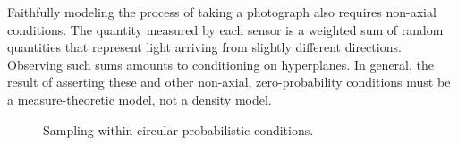 Faithfully modeling the process of taking a photograph also requires non-axial conditions.
The quantity measured by each sensor is a weighted sum of random quantities that represent light arriving from slightly different directions.
Observing such sums amounts to conditioning on hyperplanes.
In general, the result of asserting these and other non-axial, zero-probability conditions must be a measure-theoretic model, not a density model.

\begin{figure}[tb!]\centering%
\tab\tab\tab
{}
\caption[Circular probabilistic conditions]{Sampling within circular probabilistic conditions.}%
\label{fig:circular-condition-results}
\end{figure}

